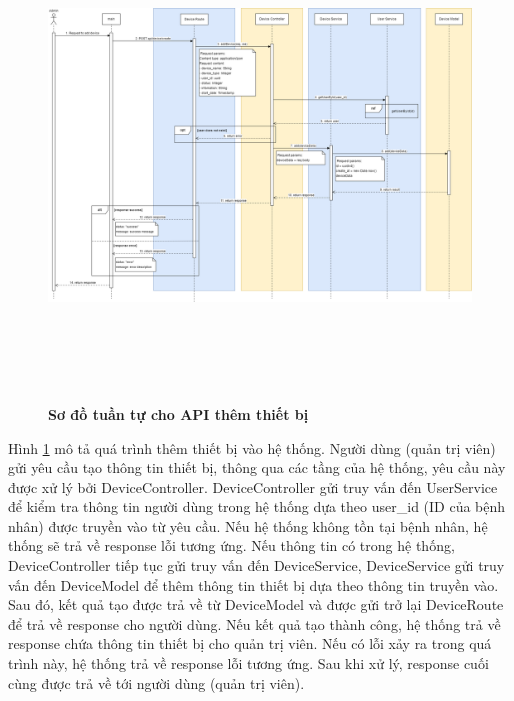 \begin{figure}[H]
  \centering
  \includegraphics[width=16cm,height=13cm]{Images/sequence_api/addDevice.png}
  \caption[Sơ đồ tuần tự cho API thêm thiết bị]{\bfseries \fontsize{12pt}{0pt}
  \selectfont Sơ đồ tuần tự cho API thêm thiết bị }
  \label{api_addDevice} %
\end{figure}
Hình \ref{api_addDevice} mô tả quá trình thêm thiết bị vào hệ thống. Người dùng (quản trị viên) gửi yêu cầu tạo thông tin thiết bị, thông qua các tầng của hệ thống, 
yêu cầu này được xử lý bởi DeviceController. DeviceController gửi truy vấn đến UserService để kiểm tra thông tin người dùng trong hệ thống dựa theo user\_id (ID của bệnh nhân) được truyền vào từ yêu cầu. 
Nếu hệ thống không tồn tại bệnh nhân, hệ thống sẽ trả về response lỗi tương ứng. Nếu thông tin có trong hệ thống, DeviceController tiếp tục gửi truy vấn đến DeviceService, DeviceService gửi truy vấn đến DeviceModel để thêm thông tin thiết bị 
dựa theo thông tin truyền vào. Sau đó, kết quả tạo được trả về từ DeviceModel và được gửi trở lại DeviceRoute để trả về response cho người dùng. Nếu kết quả tạo thành công, hệ thống trả về response chứa thông tin thiết bị cho quản trị viên. 
Nếu có lỗi xảy ra trong quá trình này, hệ thống trả về response lỗi tương ứng. Sau khi xử lý, response cuối cùng được trả về tới người dùng (quản trị viên).

